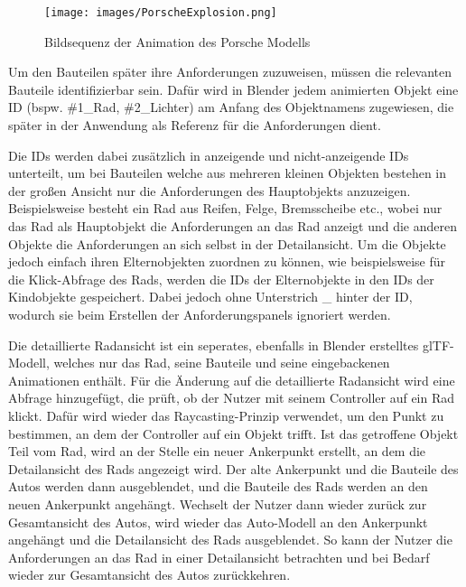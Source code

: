 \begin{figure}[H]
    \centering
    \texttt{[image: images/PorscheExplosion.png]}
    \caption{Bildsequenz der Animation des Porsche Modells}
    \label{fig:porsche-explosion}
\end{figure}

Um den Bauteilen später ihre Anforderungen zuzuweisen, müssen die relevanten Bauteile identifizierbar sein.
Dafür wird in Blender jedem animierten Objekt eine ID (bspw. \#1\_Rad, \#2\_Lichter) am Anfang des Objektnamens zugewiesen, die später in der Anwendung als Referenz für die Anforderungen dient.

Die IDs werden dabei zusätzlich in anzeigende und nicht-anzeigende IDs unterteilt, um bei Bauteilen welche aus mehreren kleinen Objekten bestehen in der großen Ansicht nur die Anforderungen des Hauptobjekts anzuzeigen.
Beispielsweise besteht ein Rad aus Reifen, Felge, Bremsscheibe etc., wobei nur das Rad als Hauptobjekt die Anforderungen an das Rad anzeigt und die anderen Objekte die Anforderungen an sich selbst in der Detailansicht.
Um die Objekte jedoch einfach ihren Elternobjekten zuordnen zu können, wie beispielsweise für die Klick-Abfrage des Rads, werden die IDs der Elternobjekte in den IDs der Kindobjekte gespeichert.
Dabei jedoch ohne Unterstrich \glqq{}\_\grqq{} hinter der ID, wodurch sie beim Erstellen der Anforderungspanels ignoriert werden.

Die detaillierte Radansicht ist ein seperates, ebenfalls in Blender erstelltes glTF-Modell, welches nur das Rad, seine Bauteile und seine eingebackenen Animationen enthält.
Für die Änderung auf die detaillierte Radansicht wird eine Abfrage hinzugefügt, die prüft, ob der Nutzer mit seinem Controller auf ein Rad klickt.
Dafür wird wieder das Raycasting-Prinzip verwendet, um den Punkt zu bestimmen, an dem der Controller auf ein Objekt trifft.
Ist das getroffene Objekt Teil vom Rad, wird an der Stelle ein neuer Ankerpunkt erstellt, an dem die Detailansicht des Rads angezeigt wird.
Der alte Ankerpunkt und die Bauteile des Autos werden dann ausgeblendet, und die Bauteile des Rads werden an den neuen Ankerpunkt angehängt.
Wechselt der Nutzer dann wieder zurück zur Gesamtansicht des Autos, wird wieder das Auto-Modell an den Ankerpunkt angehängt und die Detailansicht des Rads ausgeblendet.
So kann der Nutzer die Anforderungen an das Rad in einer Detailansicht betrachten und bei Bedarf wieder zur Gesamtansicht des Autos zurückkehren.





